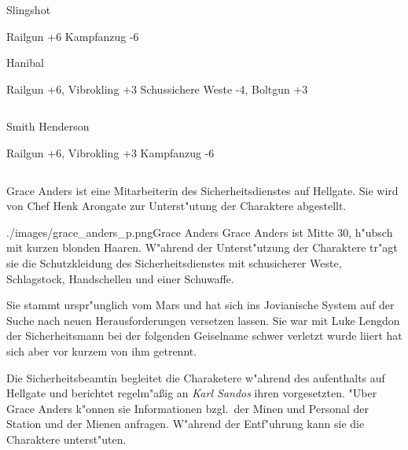 \begin{column}[l]{0.45}
    \begin{nscsheet}[h]{Slingshot}
        \nscstats[ATT=3,AGG=3,EMP=3,KNO=1,HP=10]
        \nscruler
        \begin{nscinventory}
            \nscitem[Waffen] Railgun +6
            \nscitem[R"ustung] Kampfanzug -6           
        \end{nscinventory}
    \end{nscsheet}    

    \begin{nscsheet}[h]{Hanibal}
        \nscstats[ATT=4,AGG=3,EMP=3,KNO=1,HP=12]
        \nscruler
        \begin{nscinventory}
            \nscitem[Waffen] Railgun +6, Vibrokling +3
            \nscitem[R"ustung] Schussichere Weste -4, Boltgun +3           
        \end{nscinventory}
    \end{nscsheet} 
\end{column}
\begin{column}[r]{0.45}
    \begin{nscsheet}[h]{Smith Henderson}
        \nscstats[ATT=5,AGG=4,EMP=1,KNO=1,HP=12]
        \nscruler
        \begin{nscinventory}
            \nscitem[Waffen] Railgun +6, Vibrokling +3
            \nscitem[R"ustung] Kampfanzug -6           
        \end{nscinventory}
    \end{nscsheet}
\end{column}


\newpage
{}

Grace Anders ist eine Mitarbeiterin des Sicherheitsdienstes auf Hellgate. Sie wird von Chef Henk Arongate zur 
Unterst"utung der Charaktere abgestellt. 

\begin{sideimagebox}[l]{0.5}{./images/grace_anders_p.png}{Grace Anders}
    Grace Anders ist Mitte 30, h"ubsch mit kurzen blonden Haaren. W"ahrend der Unterst"utzung der Charaktere tr"agt sie 
    die Schutzkleidung des Sicherheitsdienstes mit schu\3sicherer Weste, Schlagstock, Handschellen und einer Schu\3waffe. 

    Sie stammt urspr"unglich vom Mars und hat sich ins Jovianische System auf der Suche nach neuen Herausforderungen 
    versetzen lassen. Sie war mit Luke Lengdon der Sicherheitsmann bei der folgenden Geiselname schwer verletzt wurde 
    liiert hat sich aber vor kurzem von ihm getrennt.

    Die Sicherheitsbeamtin begleitet die Charaketere w"ahrend des aufenthalts auf Hellgate und berichtet regelm"aßig an 
    \emph{Karl Sandos} ihren vorgesetzten. "Uber Grace Anders k"onnen sie Informationen bzgl.~der Minen und Personal der 
    Station und der Mienen anfragen. W"ahrend der Entf"uhrung kann sie die Charaktere unterst"uten.
\end{sideimagebox}

